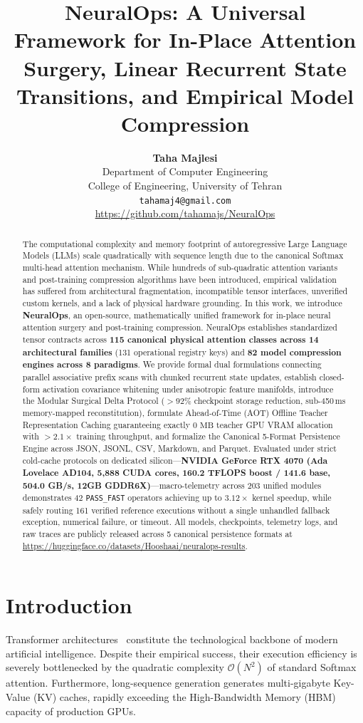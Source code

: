 \documentclass{article}
\title{NeuralOps: A Universal Framework for In-Place Attention Surgery, Linear Recurrent State Transitions, and Empirical Model Compression}
\author{
  \textbf{Taha Majlesi} \\
  Department of Computer Engineering \\
  College of Engineering, University of Tehran \\
  \texttt{tahamaj4@gmail.com} \\
  \url{https://github.com/tahamajs/NeuralOps}
}
\newcommand{\passfast}{\texttt{PASS\_FAST}}
\begin{document}
\maketitle

\begin{abstract}
The computational complexity and memory footprint of autoregressive Large Language Models (LLMs) scale quadratically with sequence length due to the canonical Softmax multi-head attention mechanism. While hundreds of sub-quadratic attention variants and post-training compression algorithms have been introduced, empirical validation has suffered from architectural fragmentation, incompatible tensor interfaces, unverified custom kernels, and a lack of physical hardware grounding. In this work, we introduce \textbf{NeuralOps}, an open-source, mathematically unified framework for in-place neural attention surgery and post-training compression. NeuralOps establishes standardized tensor contracts across \textbf{115 canonical physical attention classes across 14 architectural families} (131 operational registry keys) and \textbf{82 model compression engines across 8 paradigms}. We provide formal dual formulations connecting parallel associative prefix scans with chunked recurrent state updates, establish closed-form activation covariance whitening under anisotropic feature manifolds, introduce the Modular Surgical Delta Protocol ($>92\%$ checkpoint storage reduction, sub-450\,ms memory-mapped reconstitution), formulate Ahead-of-Time (AOT) Offline Teacher Representation Caching guaranteeing exactly $0\text{ MB}$ teacher GPU VRAM allocation with $>2.1\times$ training throughput, and formalize the Canonical 5-Format Persistence Engine across JSON, JSONL, CSV, Markdown, and Parquet. Evaluated under strict cold-cache protocols on dedicated silicon---\textbf{NVIDIA GeForce RTX 4070 (Ada Lovelace AD104, 5,888 CUDA cores, 160.2 TFLOPS boost / 141.6 base, 504.0 GB/s, 12GB GDDR6X)}---macro-telemetry across 203 unified modules demonstrates 42 \passfast{} operators achieving up to $3.12\times$ kernel speedup, while safely routing 161 verified reference executions without a single unhandled fallback exception, numerical failure, or timeout. All models, checkpoints, telemetry logs, and raw traces are publicly released across 5 canonical persistence formats at \url{https://huggingface.co/datasets/Hooshaai/neuralops-results}.
\end{abstract}

\section{Introduction}
\label{sec:introduction}
Transformer architectures~\citep{vaswani2017attention} constitute the technological backbone of modern artificial intelligence. Despite their empirical success, their execution efficiency is severely bottlenecked by the quadratic complexity $\mathcal{O}(N^2)$ of standard Softmax attention. Furthermore, long-sequence generation generates multi-gigabyte Key-Value (KV) caches, rapidly exceeding the High-Bandwidth Memory (HBM) capacity of production GPUs.
\end{document}
